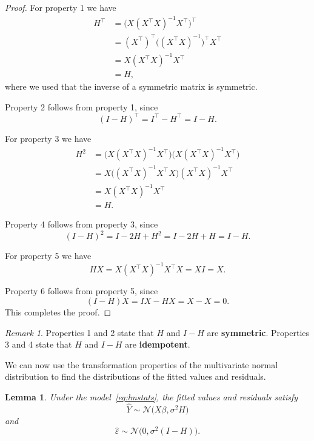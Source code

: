 \documentclass[
  a4paper,
]{article}
\newtheorem{lemma}{Lemma}[section]
\theoremstyle{definition}
\theoremstyle{definition}
\theoremstyle{definition}
\theoremstyle{definition}
\theoremstyle{remark}
\newtheorem*{remark}{Remark}
\begin{document}
\begin{proof}
For property 1 we have
\begin{align*}
  H^\top
  &= \bigl( X (X^\top X)^{-1} X^\top \bigr)^\top \\
  &= (X^\top)^\top \bigl((X^\top X)^{-1}\bigr)^\top X^\top \\
  &= X (X^\top X)^{-1} X^\top \\
  &= H,
\end{align*}
where we used that the inverse of a symmetric matrix is symmetric.

Property 2 follows from property 1, since
\begin{equation*}
  (I - H)^\top = I^\top - H^\top = I - H.
\end{equation*}

For property 3 we have
\begin{align*}
  H^2
  &= \bigl( X (X^\top X)^{-1} X^\top \bigr) \bigl( X (X^\top X)^{-1} X^\top \bigr) \\
  &= X \bigl( (X^\top X)^{-1} X^\top X \bigr) (X^\top X)^{-1} X^\top \\
  &= X (X^\top X)^{-1} X^\top \\
  &= H.
\end{align*}

Property 4 follows from property 3, since
\begin{equation*}
  (I - H)^2 = I - 2H + H^2 = I - 2H + H = I - H.
\end{equation*}

For property 5 we have
\begin{equation*}
  H X = X (X^\top X)^{-1} X^\top X = X I = X.
\end{equation*}

Property 6 follows from property 5, since
\begin{equation*}
  (I - H) X = IX - HX = X - X = 0.
\end{equation*}
This completes the proof.
\end{proof}

\begin{remark}
Properties 1 and 2 state that \(H\) and \(I - H\) are \textbf{symmetric}.
Properties 3 and 4 state that \(H\) and \(I - H\) are \textbf{idempotent}.
\end{remark}

We can now use the transformation properties of the multivariate normal
distribution to find the distributions of the fitted values and residuals.

\begin{lemma}
\protect\hypertarget{lem:hat-y-eps-dist}{}\label{lem:hat-y-eps-dist}Under the model~\eqref{eq:lmstats}, the fitted values and residuals satisfy
\begin{equation}
  \hat Y \sim \mathcal{N}\bigl( X\beta, \sigma^2 H \bigr)  \label{eq:hat-y-dist}
\end{equation}
and
\begin{equation}
  \hat\varepsilon\sim \mathcal{N}\bigl( 0, \sigma^2 (I - H) \bigr).  \label{eq:hat-eps-dist}
\end{equation}
\end{lemma}
\end{document}
